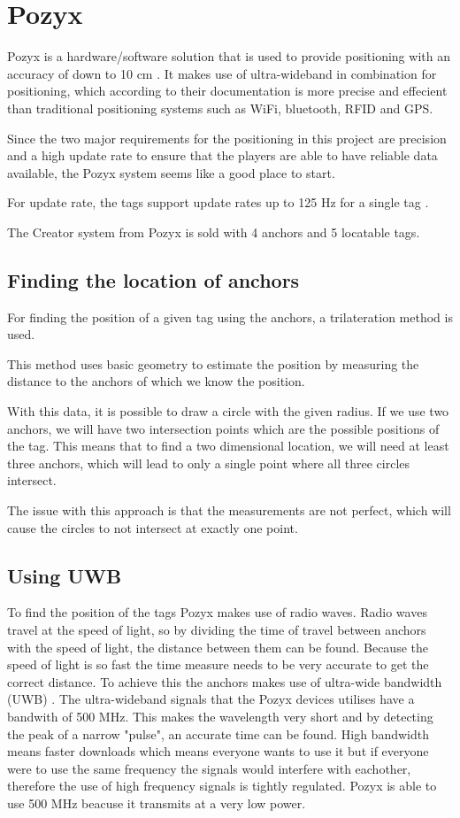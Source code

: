 \section{Pozyx}
Pozyx is a hardware/software solution that is used to provide positioning with an accuracy of down to 10 cm \cite{pozyx}.
It makes use of ultra-wideband in combination for positioning, which according to their documentation is more precise and effecient than traditional positioning systems such as WiFi, bluetooth, RFID and GPS.

Since the two major requirements for the positioning in this project are precision and a high update rate to ensure that the players are able to have reliable data available, the Pozyx system seems like a good place to start.

For update rate, the tags support update rates up to 125 Hz for a single tag \cite{pozyx}.

The Creator system from Pozyx is sold with 4 anchors and 5 locatable tags.

\subsection{Finding the location of anchors}
For finding the position of a given tag using the anchors, a trilateration method is used.

This method uses basic geometry to estimate the position by measuring the distance to the anchors of which we know the position.

With this data, it is possible to draw a circle with the given radius.
If we use two anchors, we will have two intersection points which are the possible positions of the tag.
This means that to find a two dimensional location, we will need at least three anchors, which will lead to only a single point where all three circles intersect.

The issue with this approach is that the measurements are not perfect, which will cause the circles to not intersect at exactly one point.

\subsection{Using UWB}
To find the position of the tags Pozyx makes use of radio waves. 
Radio waves travel at the speed of light, so by dividing the time of travel between anchors with the speed of light, the distance between them can be found.
Because the speed of light is so fast the time measure needs to be very accurate to get the correct distance.
To achieve this the anchors makes use of ultra-wide bandwidth (UWB) \cite{pozyx-UWB}.
The ultra-wideband signals that the Pozyx devices utilises have a bandwith of 500 MHz.
This makes the wavelength very short and by detecting the peak of a narrow "pulse", an accurate time can be found.
High bandwidth means faster downloads which means everyone wants to use it but if everyone were to use the same frequency the signals would interfere with eachother, therefore the use of high frequency signals is tightly regulated.
Pozyx is able to use 500 MHz beacuse it transmits at a very low power.


